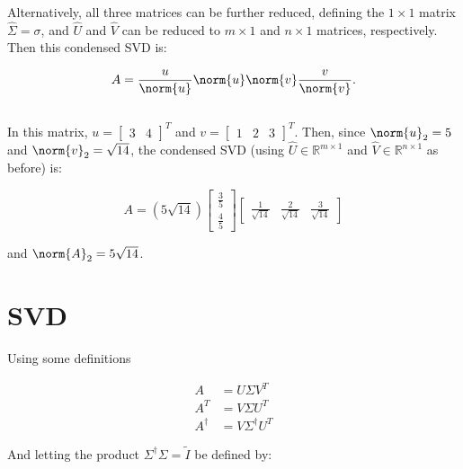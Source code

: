 \documentclass{template}
\begin{document}
Alternatively, all three matrices can be further reduced, defining the $1\times 1$ matrix $\hat{\Sigma} = \sigma$, and $\hat{U}$ and $\hat{V}$ can be reduced to $m\times 1$ and $n \times 1$ matrices, respectively. Then this condensed SVD is:

\begin{equation}
  A = \frac{u}{\norm{u}}\norm{u}\norm{v}\frac{v}{\norm{v}}.
\end{equation}

\subsection{}

In this matrix, $u = \begin{bmatrix}3&4\end{bmatrix}^T$ and $v = \begin{bmatrix}1&2&3\end{bmatrix}^T$. Then, since $\norm{u}_2 = 5$ and $\norm{v}_2 = \sqrt{14}$, the condensed SVD (using $\hat{U} \in \mathbb{R}^{m\times 1}$ and $\hat{V} \in \mathbb{R}^{n\times 1}$ as before) is:

\begin{equation}
  A = (5\sqrt{14}) \begin{bmatrix}
    \frac{3}{5}\\
    \frac{4}{5}
  \end{bmatrix}\begin{bmatrix}
    \frac{1}{\sqrt{14}} & \frac{2}{\sqrt{14}} & \frac{3}{\sqrt{14}}
  \end{bmatrix}
\end{equation}

and $\norm{A}_2 = 5\sqrt{14}$.


\section{SVD}

Using some definitions

\begin{equation}
  \begin{aligned}
    A &= U\Sigma V^T\\
    A^T &= V \Sigma U^T\\
    A^\dagger &= V\Sigma^\dagger U^T
  \end{aligned}
\end{equation}

And letting the product $\Sigma^\dagger \Sigma = \tilde{I}$ be defined by:
\end{document}
